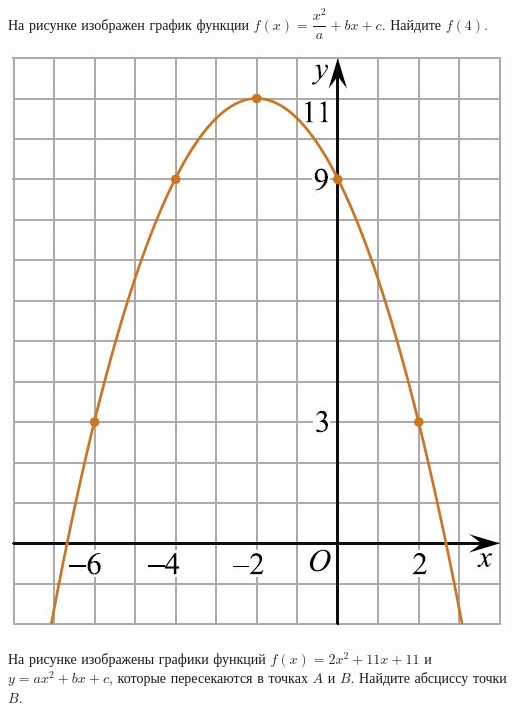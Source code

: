 \begin{class}[number=8]
\begin{listofex}
\begin{minipage}[c]{0.3\textwidth}
		\end{minipage}
		\item
		\begin{minipage}[t]{0.57\textwidth}
			На рисунке изображен график функции \( f(x)=\dfrac{x^2}{a}+bx+c \). Найдите \( f(4) \).
		\end{minipage}
		\begin{minipage}[c]{0.3\textwidth}
			\includegraphics[align=t, width=\textwidth]{pics/G112M3C2-4}
		\end{minipage}
		\item
		\begin{minipage}[t]{0.57\textwidth}
			На рисунке изображены графики функций \( f(x)=2x^2+11x+11 \) и \( y=ax^2+bx+c \), которые пересекаются в точках \( A \) и \( B \). Найдите абсциссу точки \( B \).
		\end{minipage}
		\begin{minipage}[c]{0.3\textwidth}

\end{minipage}
\end{listofex}
\end{class}
